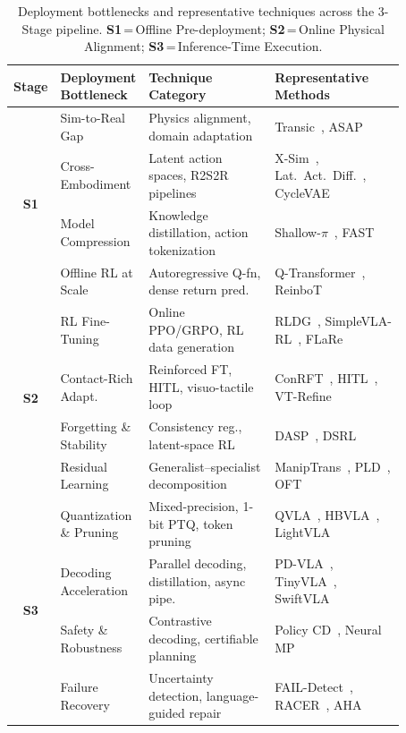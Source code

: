 \documentclass[acmsmall,screen,review,anonymous]{acmart}
\begin{document}
\begin{table}[t!]
\centering
\caption{Deployment bottlenecks and representative techniques across the 3-Stage pipeline.
\textbf{S1}\,=\,Offline Pre-deployment; \textbf{S2}\,=\,Online Physical Alignment; \textbf{S3}\,=\,Inference-Time Execution.}\label{tab:deployment_lifecycle}
\renewcommand{\arraystretch}{1.15}
\setlength{\tabcolsep}{3pt}
\scriptsize
\begin{tabular}{
  c
  p{0.20\linewidth}
  p{0.33\linewidth}
  p{0.34\linewidth}
}
\toprule
\textbf{Stage} & \textbf{Deployment Bottleneck} & \textbf{Technique Category} & \textbf{Representative Methods} \\
\midrule
\multirow{4}{*}{\textbf{S1}}
 & Sim-to-Real Gap & Physics alignment, domain adaptation & Transic~\cite{jiang2024transic}, ASAP~\cite{he2025asap} \\
 & Cross-Embodiment & Latent action spaces, R2S2R pipelines & X-Sim~\cite{dan2025xsim}, Lat.\ Act.\ Diff.~\cite{bauer2025latentaction}, CycleVAE~\cite{dastider2025cyclevae} \\
 & Model Compression & Knowledge distillation, action tokenization & Shallow-$\pi$~\cite{jeon2026shallowpi}, FAST~\cite{pertsch2025fast} \\
 & Offline RL at Scale & Autoregressive Q-fn, dense return pred. & Q-Transformer~\cite{chebotar2023qtransformer}, ReinboT~\cite{zhang2025reinbot} \\
\midrule
\multirow{4}{*}{\textbf{S2}}
 & RL Fine-Tuning & Online PPO/GRPO, RL data generation & RLDG~\cite{xu2024rldg}, SimpleVLA-RL~\cite{li2025simplevla}, FLaRe~\cite{hu2024flare} \\
 & Contact-Rich Adapt. & Reinforced FT, HITL, visuo-tactile loop & ConRFT~\cite{chen2025conrft}, HITL~\cite{luo2025humaninloop}, VT-Refine~\cite{huang2025vtrefine} \\
 & Forgetting \& Stability & Consistency reg., latent-space RL & DASP~\cite{liu2025dasp}, DSRL~\cite{wagenmaker2025steering} \\
 & Residual Learning & Generalist--specialist decomposition & ManipTrans~\cite{li2025maniptrans}, PLD~\cite{xiao2025pld}, OFT~\cite{kim2025oft} \\
\midrule
\multirow{4}{*}{\textbf{S3}}
 & Quantization \& Pruning & Mixed-precision, 1-bit PTQ, token pruning & QVLA~\cite{xu2026qvla}, HBVLA~\cite{yan2026hbvla}, LightVLA~\cite{jiang2025lightvla} \\
 & Decoding Acceleration & Parallel decoding, distillation, async pipe. & PD-VLA~\cite{pdvla2025}, TinyVLA~\cite{wen2025tinyvla}, SwiftVLA~\cite{ni2025swiftvla} \\
 & Safety \& Robustness & Contrastive decoding, certifiable planning & Policy CD~\cite{wu2026policycontrastive}, Neural MP~\cite{dalal2024neuralmp} \\
 & Failure Recovery & Uncertainty detection, language-guided repair & FAIL-Detect~\cite{xu2025detectfailures}, RACER~\cite{dai2024racer}, AHA~\cite{duan2024aha} \\
\bottomrule
\end{tabular}
\end{table}
\end{document}
